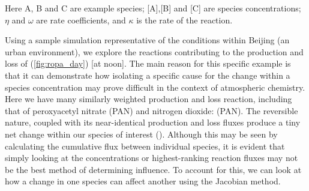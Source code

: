 Here A, B and C are example species; [A],[B] and [C] are species concentrations; $\eta$ and $\omega$ are rate coefficients, and $\kappa$ is the rate of the reaction.

Using a sample simulation representative of the conditions within Beijing (an urban environment), we explore the reactions contributing to the production and loss of 
(\autoref{fig:ropa_day}) [at noon]. The main reason for this specific example is that it can demonstrate how isolating a specific cause for the change within a species concentration may prove difficult in the context of atmospheric chemistry. Here we have many similarly weighted production and loss reaction, including that of peroxyacetyl nitrate (PAN) and nitrogen dioxide:
 (PAN). The reversible nature, coupled with its near-identical production and loss fluxes produce a tiny net change within our species of interest (). Although this may be seen by calculating the cumulative flux between individual species, it is evident that simply looking at the concentrations or highest-ranking reaction fluxes may not be the best method of determining influence. To account for this, we can look at how a change in one species can affect another using the Jacobian method.


